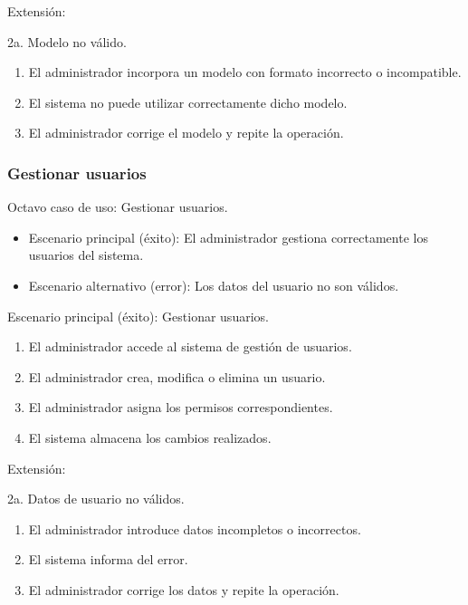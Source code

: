 \documentclass[12pt,a4paper]{report}
\begin{document}
\medskip

\noindent Extensión:

2a. Modelo no válido.
\begin{enumerate}[leftmargin=1.5cm]
    \item El administrador incorpora un modelo con formato incorrecto o incompatible.
    \item El sistema no puede utilizar correctamente dicho modelo.
    \item El administrador corrige el modelo y repite la operación.
\end{enumerate}

\medskip

\subsubsection{Gestionar usuarios}

\noindent Octavo caso de uso: Gestionar usuarios.

\begin{itemize}[leftmargin=1.5cm]
    \item Escenario principal (éxito): El administrador gestiona correctamente los usuarios del sistema.
    \item Escenario alternativo (error): Los datos del usuario no son válidos.
\end{itemize}

\medskip

\noindent Escenario principal (éxito): Gestionar usuarios.
\begin{enumerate}[leftmargin=1.5cm]
    \item El administrador accede al sistema de gestión de usuarios.
    \item El administrador crea, modifica o elimina un usuario.
    \item El administrador asigna los permisos correspondientes.
    \item El sistema almacena los cambios realizados.
\end{enumerate}

\medskip

\noindent Extensión:

2a. Datos de usuario no válidos.
\begin{enumerate}[leftmargin=1.5cm]
    \item El administrador introduce datos incompletos o incorrectos.
    \item El sistema informa del error.
    \item El administrador corrige los datos y repite la operación.
\end{enumerate}
\end{document}
